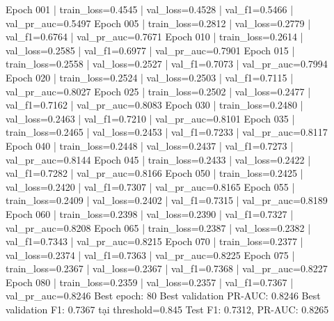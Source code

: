 \documentclass[12pt,a4paper]{report}
\begin{document}
\begin{NotebookOutput}
Epoch 001 | train_loss=0.4545 | val_loss=0.4528 | val_f1=0.5466 | val_pr_auc=0.5497
Epoch 005 | train_loss=0.2812 | val_loss=0.2779 | val_f1=0.6764 | val_pr_auc=0.7671
Epoch 010 | train_loss=0.2614 | val_loss=0.2585 | val_f1=0.6977 | val_pr_auc=0.7901
Epoch 015 | train_loss=0.2558 | val_loss=0.2527 | val_f1=0.7073 | val_pr_auc=0.7994
Epoch 020 | train_loss=0.2524 | val_loss=0.2503 | val_f1=0.7115 | val_pr_auc=0.8027
Epoch 025 | train_loss=0.2502 | val_loss=0.2477 | val_f1=0.7162 | val_pr_auc=0.8083
Epoch 030 | train_loss=0.2480 | val_loss=0.2463 | val_f1=0.7210 | val_pr_auc=0.8101
Epoch 035 | train_loss=0.2465 | val_loss=0.2453 | val_f1=0.7233 | val_pr_auc=0.8117
Epoch 040 | train_loss=0.2448 | val_loss=0.2437 | val_f1=0.7273 | val_pr_auc=0.8144
Epoch 045 | train_loss=0.2433 | val_loss=0.2422 | val_f1=0.7282 | val_pr_auc=0.8166
Epoch 050 | train_loss=0.2425 | val_loss=0.2420 | val_f1=0.7307 | val_pr_auc=0.8165
Epoch 055 | train_loss=0.2409 | val_loss=0.2402 | val_f1=0.7315 | val_pr_auc=0.8189
Epoch 060 | train_loss=0.2398 | val_loss=0.2390 | val_f1=0.7327 | val_pr_auc=0.8208
Epoch 065 | train_loss=0.2387 | val_loss=0.2382 | val_f1=0.7343 | val_pr_auc=0.8215
Epoch 070 | train_loss=0.2377 | val_loss=0.2374 | val_f1=0.7363 | val_pr_auc=0.8225
Epoch 075 | train_loss=0.2367 | val_loss=0.2367 | val_f1=0.7368 | val_pr_auc=0.8227
Epoch 080 | train_loss=0.2359 | val_loss=0.2357 | val_f1=0.7367 | val_pr_auc=0.8246
Best epoch: 80
Best validation PR-AUC: 0.8246
Best validation F1: 0.7367 tại threshold=0.845
Test F1: 0.7312, PR-AUC: 0.8265
\end{NotebookOutput}

\begin{table}[htbp]\centering\caption{Ba mô hình được chọn trên diabetes large (test set)}\label{tab:diabetes-results}
\end{table}
\end{document}
